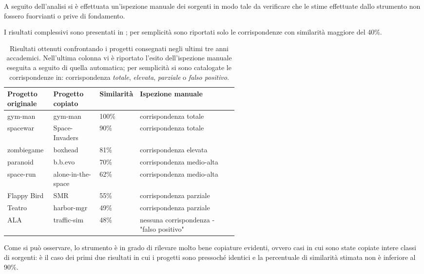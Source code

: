 A seguito dell'analisi si è effettuata un'ispezione manuale dei sorgenti in modo tale da verificare che le stime effettuate dallo strumento non fossero fuorvianti o prive di fondamento.

I risultati complessivi sono presentati in ; per semplicità sono riportati solo le corrispondenze con similarità maggiore del 40\%.

\begin{table}[h!]
    \centering
    \begin{tabular}{|p{0.2\linewidth}|p{0.2\linewidth}|p{0.15\linewidth}|p{}|}
        \hline
        \textbf{Progetto originale} & \textbf{Progetto copiato} & \textbf{Similarità} & \textbf{Ispezione manuale} \\ [0.5ex] 
        \hline\hline
        gym-man & gym-man & 100\% & corrispondenza totale \\
        \hline
        spacewar & Space-Invaders & 90\% & corrispondenza totale \\
        \hline
        zombiegame & boxhead & 81\% & corrispondenza elevata \\
        \hline
        paranoid & b.b.evo & 70\% & corrispondenza medio-alta \\
        \hline
        space-run & alone-in-the-space & 62\% & corrispondenza medio-alta \\
        \hline
        Flappy Bird & SMR & 55\% & corrispondenza parziale \\
        \hline
        Teatro & harbor-mgr & 49\% & corrispondenza parziale \\
        \hline
        ALA & traffic-sim & 48\% & nessuna corrispondenza - "falso positivo" \\
        \hline
    \end{tabular}
    \caption[Risultati ottenuti confrontando i progetti sottomessi negli ultimi tre anni accademici]{Risultati ottenuti confrontando i progetti consegnati negli ultimi tre anni accademici. Nell'ultima colonna vi è riportato l'esito dell'ispezione manuale eseguita a seguito di quella automatica; per semplicità si sono catalogate le corrispondenze in: corrispondenza \textit{totale}, \textit{elevata}, \textit{parziale} o \textit{falso positivo}.}
    \label{table:results}
\end{table}

Come si può osservare, lo strumento è in grado di rilevare molto bene copiature evidenti, ovvero casi in cui sono state copiate intere classi di sorgenti: è il caso dei primi due risultati in cui i progetti sono pressoché identici e la percentuale di similarità stimata non è inferiore al 90\%.
%

